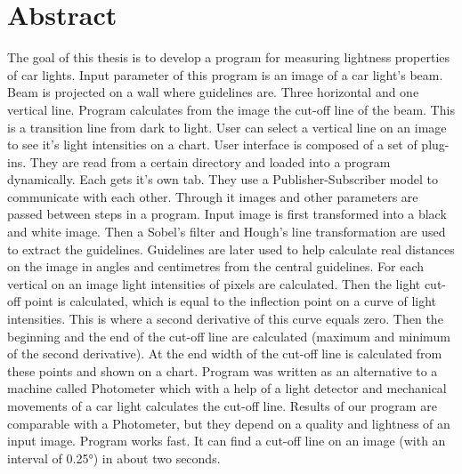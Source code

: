 \documentclass[oneside, a4paper, 12pt]{book}
\begin{document}
\chapter*{Abstract}

The goal of this thesis is to develop a program for measuring lightness properties of car lights. Input parameter of this program is an image of a car light's beam. Beam is projected on a wall where guidelines are. Three horizontal and one vertical line. Program calculates from the image the cut-off line of the beam. This is a transition line from dark to light. User can select a vertical line on an image to see it's light intensities on a chart. User interface is composed of a set of plug-ins. They are read from a certain directory and loaded into a program dynamically. Each gets it's own tab. They use a Publisher-Subscriber model to communicate with each other. Through it images and other parameters are passed between steps in a program. Input image is first transformed into a black and white image. Then a Sobel's filter and Hough's line transformation are used to extract the guidelines. Guidelines are later used to help calculate real distances on the image in angles and centimetres from the central guidelines. For each vertical on an image light intensities of pixels are calculated. Then the light cut-off point is calculated, which is equal to the inflection point on a curve of light intensities. This is where a second derivative of this curve equals zero. Then the beginning and the end of the cut-off line are calculated (maximum and minimum of the second derivative). At the end width of the cut-off line is calculated from these points and shown on a chart. Program was written as an alternative to a machine called Photometer which with a help of a light detector and mechanical movements of a car light calculates the cut-off line. Results of our program are comparable with a Photometer, but they depend on a quality and lightness of an input image. Program works fast. It can find a cut-off line on an image (with an interval of 0.25°) in about two seconds.


\renewcommand{\chaptermark}[1]%
{\markboth{\MakeUppercase{\thechapter.\ #1}}{}} \renewcommand{\sectionmark}[1]%
{\markright{\MakeUppercase{\thesection.\ #1}}} \renewcommand{\headrulewidth}{0.5pt} \renewcommand{\footrulewidth}{0pt} 
\fancyhf{}
\fancyhead[LE,RO]{\sl \thepage} \fancyhead[LO]{\sl \rightmark} \fancyhead[RE]{\sl \leftmark}
\end{document}
